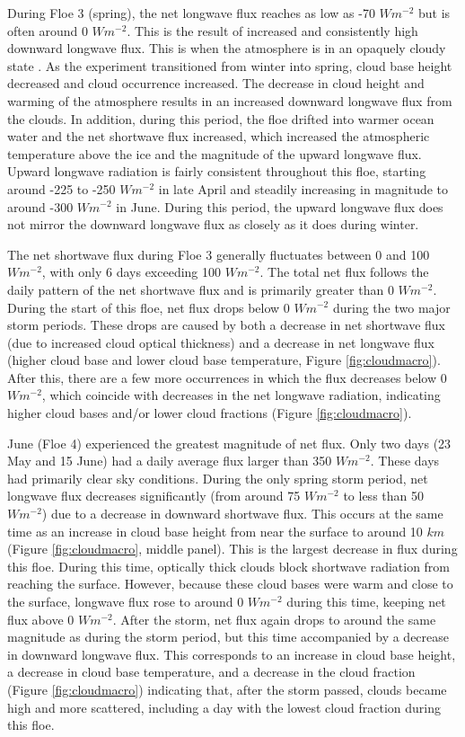 During Floe 3 (spring), the net longwave flux reaches as low as -70 $Wm^{-2}$ but is often around 0 $Wm^{-2}$. This is the result of increased and consistently high downward longwave flux. This is when the atmosphere is in an opaquely cloudy state \citep{stramler:2011, graham:2017}. As the experiment transitioned from winter into spring, cloud base height decreased and cloud occurrence increased. The decrease in cloud height and warming of the atmosphere results in an increased downward longwave flux from the clouds. In addition, during this period, the floe drifted into warmer ocean water \citep{kayser:2017} and the net shortwave flux increased, which increased the atmospheric temperature above the ice and the magnitude of the upward longwave flux. Upward longwave radiation is fairly consistent throughout this floe, starting around -225 to -250 $Wm^{-2}$ in late April and steadily increasing in magnitude to around -300 $Wm^{-2}$ in June. During this period, the upward longwave flux does not mirror the downward longwave flux as closely as it does during winter.

The net shortwave flux during Floe 3 generally fluctuates between 0 and 100 $Wm^{-2}$, with only 6 days exceeding 100 $Wm^{-2}$. The total net flux follows the daily pattern of the net shortwave flux and is primarily greater than 0 $Wm^{-2}$. During the start of this floe, net flux drops below 0 $Wm^{-2}$ during the two major storm periods. These drops are caused by both a decrease in net shortwave flux (due to increased cloud optical thickness) and a decrease in net longwave flux (higher cloud base and lower cloud base temperature, Figure \ref{fig:cloudmacro}). After this, there are a few more occurrences in which the flux decreases below 0 $Wm^{-2}$, which coincide with decreases in the net longwave radiation, indicating higher cloud bases and/or lower cloud fractions (Figure \ref{fig:cloudmacro}).  

June (Floe 4) experienced the greatest magnitude of net flux. Only two days (23 May and 15 June) had a daily average flux larger than 350 $Wm^{-2}$. These days had primarily clear sky conditions. During the only spring storm period, net longwave flux decreases significantly (from around 75 $Wm^{-2}$ to less than 50 $Wm^{-2}$) due to a decrease in downward shortwave flux. This occurs at the same time as an increase in cloud base height from near the surface to around 10 $km$ (Figure \ref{fig:cloudmacro}, middle panel). This is the largest decrease in flux during this floe. During this time, optically thick clouds block shortwave radiation from reaching the surface. However, because these cloud bases were warm and close to the surface, longwave flux rose to around 0 $Wm^{-2}$ during this time, keeping net flux above 0 $Wm^{-2}$. After the storm, net flux again drops to around the same magnitude as during the storm period, but this time accompanied by a decrease in downward longwave flux. This corresponds to an increase in cloud base height, a decrease in cloud base temperature, and a decrease in the cloud fraction (Figure \ref{fig:cloudmacro}) indicating that, after the storm passed, clouds became high and more scattered, including a day with the lowest cloud fraction during this floe. 

